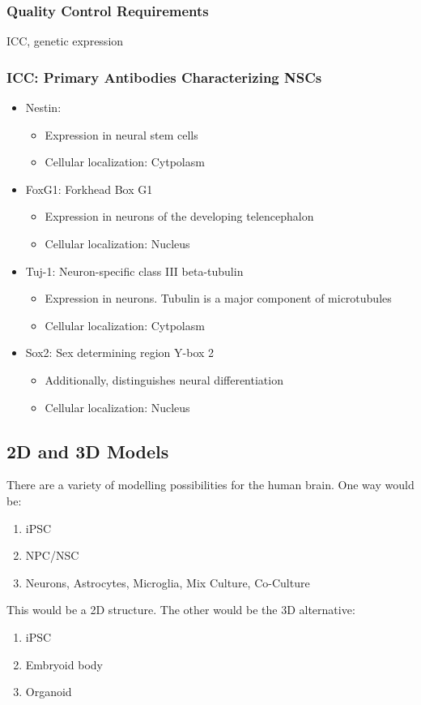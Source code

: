 \begin{itemize}
\subsubsection{Quality Control Requirements}
ICC, genetic expression
\subsubsection{ICC: Primary Antibodies Characterizing NSCs}
\begin{itemize}
    \item Nestin: 
    \begin{itemize}
        \item Expression in neural stem cells
        \item Cellular localization: Cytpolasm
        
    \end{itemize}
    \item FoxG1: Forkhead Box G1
    \begin{itemize}
        \item Expression in neurons of the developing telencephalon
        \item Cellular localization: Nucleus
    \end{itemize}
\item Tuj-1: Neuron-specific class III beta-tubulin
\begin{itemize}
    \item Expression in neurons. Tubulin is a major component of microtubules
    \item Cellular localization: Cytpolasm
    
\end{itemize}
\item Sox2: Sex determining region Y-box 2
\begin{itemize}
    \item Additionally, distinguishes neural differentiation
    \item Cellular localization: Nucleus
\end{itemize}
\end{itemize}
\subsection{2D and 3D Models}
There are a variety of modelling possibilities for the human brain. One way would be:
\begin{enumerate}
    \item iPSC
    \item NPC/NSC
    \item Neurons, Astrocytes, Microglia, Mix Culture, Co-Culture
\end{enumerate}
This would be a 2D structure. The other would be the 3D alternative:
\begin{enumerate}
    \item iPSC
    \item Embryoid body
\item Organoid 
\end{enumerate}


\end{itemize}
